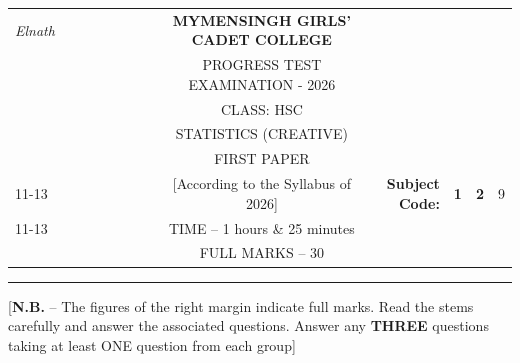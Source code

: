 \documentclass[12pt]{article}
\begin{document}
\begin{table}[]
\begin{tabular}{llllllllcllcl}
\textit{Elnath} &  &  &  &  &  &  &  & \textbf{MYMENSINGH GIRLS’ CADET COLLEGE} &                                             &                                 & \multicolumn{1}{l}{}            &                        \\
                 &  &  &  &  &  &  &  & PROGRESS TEST EXAMINATION - 2026          &                                             &                                 &                                 &                        \\
                 &  &  &  &  &  &  &  & CLASS: HSC                               &                                             &                                 &                                 &                        \\
                 &  &  &  &  &  &  &  & STATISTICS (CREATIVE)                    &                                             &                                 &                                 &                        \\
                 &  &  &  &  &  &  &  & FIRST PAPER                             &                                             &                                 & \multicolumn{1}{r}{}            &                        \\ \cline{11-13} 
                 &  &  &  &  &  &  &  & [According to the Syllabus of 2026]      & \multicolumn{1}{r|}{\textbf{Subject Code:}} & \multicolumn{1}{l|}{\textbf{1}} & \multicolumn{1}{l|}{\textbf{2}} & \multicolumn{1}{l|}{9} \\ \cline{11-13} 
                 &  &  &  &  &  &  &  & TIME – 1 hours \& 25 minutes             &                                             &                                 & \multicolumn{1}{r}{}            &                        \\
                 &  &  &  &  &  &  &  & FULL MARKS – 30                          &                                             &                                 & \multicolumn{1}{r}{\textbf{}}   &                       
\end{tabular}
\end{table}


\hrule

\begin{center}
[\textbf{N.B.} – The figures of the right margin indicate full marks. Read the stems carefully and answer the associated questions. Answer any \textbf{THREE} questions taking at least ONE question from each group]\\
\end{center}
\end{document}
